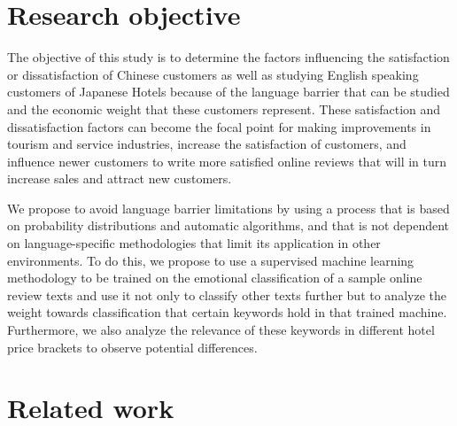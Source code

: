 \documentclass[review]{elsarticle}
\begin{document}
\section{Research objective}\label{research_objective}

The objective of this study is to determine the factors influencing the satisfaction or dissatisfaction of Chinese customers as well as studying English speaking customers of Japanese Hotels because of the language barrier that can be studied and the economic weight that these customers represent. These satisfaction and dissatisfaction factors can become the focal point for making improvements in tourism and service industries, increase the satisfaction of customers, and influence newer customers to write more satisfied online reviews that will in turn increase sales and attract new customers. 

We propose to avoid language barrier limitations by using a process that is based on probability distributions and automatic algorithms, and that is not dependent on language-specific methodologies that limit its application in other environments. To do this, we propose to use a supervised machine learning methodology to be trained on the emotional classification of a sample online review texts and use it not only to classify other texts further but to analyze the weight towards classification that certain keywords hold in that trained machine. Furthermore, we also analyze the relevance of these keywords in different hotel price brackets to observe potential differences. 

\section{Related work}\label{relatedwork}
\end{document}
